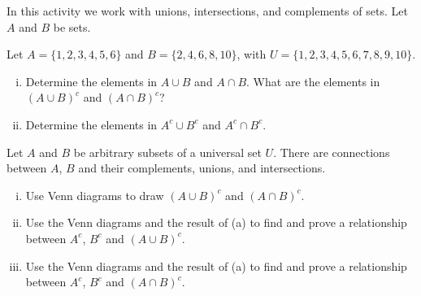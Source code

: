 \begin{activity} \label{act:sets_1} In this activity we work with unions, intersections, and complements of sets. Let $A$ and $B$ be sets. 
	\ba
	\item  Let $A = \{1,2,3,4,5,6\}$ and $B = \{2,4,6,8,10\}$, with $U = \{1,2,3,4,5,6,7,8,9,10\}$. 
		\begin{enumerate}[i.]
		\item Determine the elements in $A \cup B$ and $A \cap B$. What are the elements in $(A \cup B)^c$ and $(A \cap B)^c$?
		
		\item Determine the elements in $A^{c} \cup B^{c}$ and $A^{c} \cap B^{c}$. 

		\end{enumerate}

	
	\item Let $A$ and $B$ be arbitrary subsets of a universal set $U$. There are connections between $A$, $B$ and their complements, unions, and intersections. 
		\begin{enumerate}[i.]
		\item Use Venn diagrams to draw $(A \cup B)^c$ and $(A \cap B)^c$.  
		
		\item Use the Venn diagrams and the result of (a) to find and prove a relationship between $A^c$, $B^c$ and $(A \cup B)^c$.

		\item Use the Venn diagrams and the result of (a) to find and prove a relationship between $A^c$, $B^c$ and $(A \cap B)^c$.

		\end{enumerate}
		
	\ea
\end{activity}

